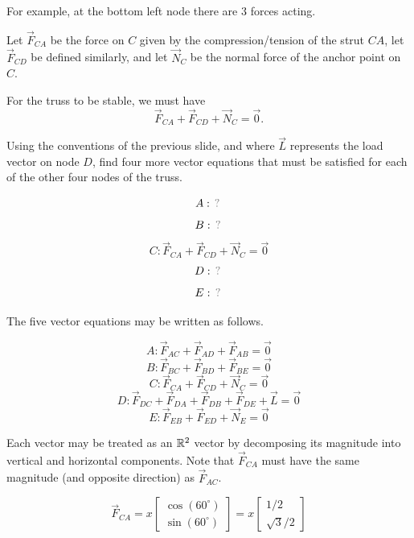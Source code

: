 \begin{applicationActivities}
\begin{remark}
For example, at the bottom left node there are 3 forces acting.

\drawtruss{\trussCForces}

Let \(\vec F_{CA}\) be the force on \(C\) given by the compression/tension
of the strut \(CA\), let \(\vec F_{CD}\) be defined similarly, and let
\(\vec N_C\) be the normal force of the anchor point on \(C\).

\vspace{1em}

For the truss to be stable, we must have
\[
\vec F_{CA}+\vec F_{CD}+\vec N_C=\vec 0
.\]
\end{remark}

\begin{activity}{10}
Using the conventions of the previous slide, and where \(\vec L\)
represents the load vector on node \(D\), find four more vector equations
that must be satisfied for each of the other four nodes of the truss.

\drawtruss

\[
A: \unknown
\]
\[
B: \unknown
\]
\[
C: \vec F_{CA}+\vec F_{CD}+\vec N_C=\vec 0
\]
\[D:\unknown\]
\[E:\unknown\]
\end{activity}

\begin{remark}
The five vector equations may be written as follows.

\drawtruss

\[
A: \vec F_{AC}+\vec F_{AD}+\vec F_{AB}=\vec 0
\]
\[
B: \vec F_{BC}+\vec F_{BD}+\vec F_{BE}=\vec 0
\]
\[
C: \vec F_{CA}+\vec F_{CD}+\vec N_C=\vec 0
\]
\[
D: \vec F_{DC}+\vec F_{DA}+\vec F_{DB} +\vec F_{DE}+\vec L=\vec 0
\]
\[
E: \vec F_{EB}+\vec F_{ED}+\vec N_E=\vec 0
\]
\end{remark}

\begin{observation}
\drawtruss{}

Each vector may be treated as an \(\mathbb{R}^2\) vector by
decomposing its magnitude into vertical and horizontal components.
Note that \(\vec F_{CA}\) must have the same magnitude (and opposite
direction) as \(\vec F_{AC}\).

\[
  \vec{F}_{CA}
    = 
  x\begin{bmatrix} \cos(60^\circ) \\ \sin(60^\circ) \end{bmatrix}
    =
  x\begin{bmatrix} 1/2 \\ \sqrt{3}/2\end{bmatrix}
\]


\end{observation}
\end{applicationActivities}
